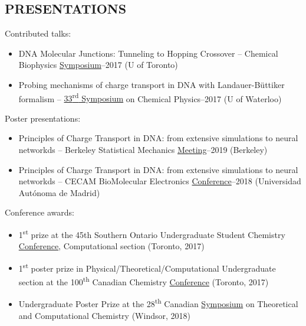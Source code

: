\documentclass[9pt, margin]{res}
\begin{document}
\begin{resume}
\section{PRESENTATIONS}
 \bigskip Contributed talks: 
 \begin{itemize}
 \item DNA Molecular Junctions:  Tunneling to Hopping Crossover -- Chemical Biophysics \href{www.chembiophys.ca}{Symposium}--2017 (U of Toronto)
 \item Probing mechanisms of charge transport in DNA with Landauer-B\"uttiker formalism -- \href{http://scp.uwaterloo.ca}{33\textsuperscript{rd} Symposium} on Chemical Physics--2017 (U of Waterloo)
 \end{itemize}
 Poster presentations: 
 \begin{itemize}
 \item Principles of Charge Transport in DNA: from extensive simulations to neural networkds -- Berkeley Statistical Mechanics  \href{http://berkeleystatmech.org/}{Meeting}--2019 (Berkeley)
 \item Principles of Charge Transport in DNA: from extensive simulations to neural networkds -- CECAM BioMolecular Electronics \href{https://www.cecam.org/workshop-0-1522.html}{Conference}--2018 (Universidad Autónoma de Madrid)
 \end{itemize}
\newpage
Conference awards:
\begin{itemize}
	\item 1\textsuperscript{st} prize at the 45th Southern Ontario Undergraduate Student Chemistry \href{http://www.souscc45.ca}{Conference}, Computational section (Toronto, 2017) %
	\item 1\textsuperscript{st} poster prize in Physical/Theoretical/Computational Undergraduate section at the 100\textsuperscript{th} Canadian Chemistry \href{http://www.csc2017.ca/student-competitions-0}{Conference} (Toronto, 2017) %
	\item  Undergraduate Poster Prize at the 28\textsuperscript{th} Canadian \href{http://catc.chem.ubc.ca/home/welcome}{Symposium} on Theoretical and Computational Chemistry (Windsor, 2018) %
\end{itemize}



\end{resume}
\end{document}
